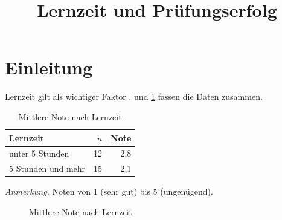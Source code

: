 \documentclass[man]{apa7}
\title{Lernzeit und Prüfungserfolg}
\begin{document}
\maketitle
\linenumbers

\section{Einleitung}
Lernzeit gilt als wichtiger Faktor \parencite{muster2024}.  und \cref{abb:noten} fassen die Daten zusammen.

\begin{table}[H]
\caption{Mittlere Note nach Lernzeit}
\label{tab:noten}
\begin{threeparttable}
\begin{tabular}{lrr}
\toprule
Lernzeit & $n$ & Note \\
\midrule
unter 5 Stunden & 12 & 2,8 \\
5 Stunden und mehr & 15 & 2,1 \\
\bottomrule
\end{tabular}
\begin{tablenotes}
\item \textit{Anmerkung.} Noten von 1 (sehr gut) bis 5 (ungenügend).
\end{tablenotes}
\end{threeparttable}
\end{table}

\begin{figure}[H]
\caption{Mittlere Note nach Lernzeit}
\label{abb:noten}
\end{figure}

\printbibliography
\end{document}
